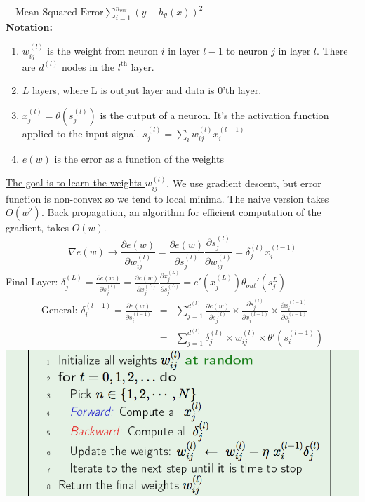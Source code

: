 \documentclass[3pt,landscape]{article}
\begin{document}
\begin{multicols}{3}
\ \ \(\text{Mean Squared Error} \sum_{i=1}^{n_{out}} (y-h_\theta(x))^2\)\\[5pt]
{\bf Notation:}
\begin{enumerate}[topsep=0pt, partopsep=0pt]
\setlength{\itemsep}{1pt}
\setlength{\parskip}{0pt}
\setlength{\parsep}{0pt}
\item $w_{ij}^{(l)}$ is the weight from neuron $i$ in layer $l-1$ to neuron $j$ in layer $l$. There are $d^{(l)}$ nodes in the $l^{\text{th}}$ layer.
\item $L$ layers, where L is output layer and data is 0'th layer.
\item \(x_j^{(l)} = \theta(s_j^{(l)})\) is the output of a neuron. It's the activation function applied to the input signal. \(s_j^{(l)}=\sum_i w_{ij}^{(l)}x_i^{(l-1)}\)
\item $e(w)$ is the error as a function of the weights
\end{enumerate}
\underline{The goal is to learn the weights $w_{ij}^{(l)}$}. We use gradient descent, but error function is non-convex so we tend to local minima. The naive version takes $O(w^2)$. \underline{Back propagation}, an algorithm for efficient computation of the gradient, takes $O(w)$.\\
\[\nabla e(w) \rightarrow \frac{\partial e(w)}{\partial w_{ij}^{(l)}} = \frac{\partial e(w)}{\partial s_{j}^{(l)}} \frac{\partial s_{j}^{(l)}}{\partial w_{ij}^{(l)}} = \delta_j^{(l)}x_i^{(l-1)}\]
Final Layer: \(\delta_j^{(L)} = \frac{\partial e(w)}{\partial s_{j}^{(l)}} = \frac{\partial e(w)}{\partial x_j^{(L)}} \frac{\partial x_j^{(L)}}{\partial s_j^{(L)}} = e'(x_j^{(L)}) \theta_{out}'(s_j^{L})\) \\
\begin{eqnarray*} \text{General: } \delta_i^{(l-1)} = \frac{\partial e(w)}{\partial s_{i}^{(l-1)}} &=& \sum_{j=1}^{d^{(l)}} \frac{\partial e(w)}{\partial s_{j}^{(l)}} \times \frac{\partial s_{j}^{(l)}}{\partial x_i^{(l-1)}} \times \frac{\partial x_i^{(l-1)}}{\partial s_i^{(l-1)}} \\
&=&  \sum_{j=1}^{d^{(l)}} \delta_j^{(l)} \times w_{ij}^{(l)} \times \theta'(s_i^{(l-1)}) \end{eqnarray*}
\includegraphics[scale=0.28]{NN1.pdf}


\end{multicols}
\end{document}
